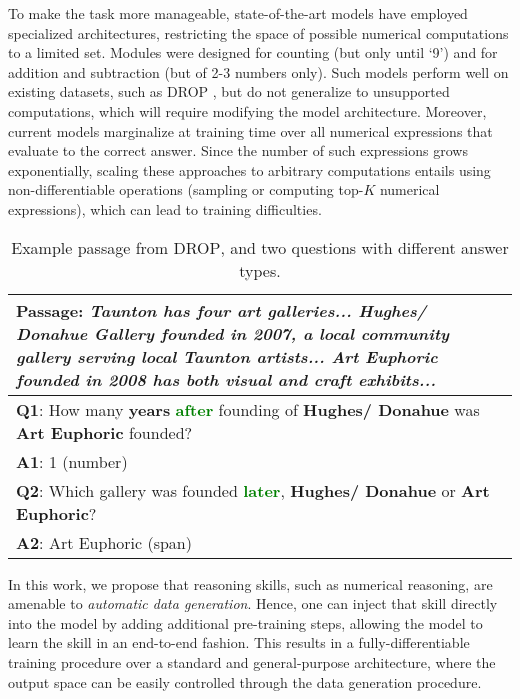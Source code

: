 \documentclass[11pt,a4paper]{article}
\newcommand\drop{\textsc{DROP}}
\begin{document}
To make the task more manageable, state-of-the-art models have employed specialized architectures, restricting the space of possible numerical computations to a limited set. Modules were designed for counting (but only until `9') and for addition and subtraction (but of 2-3 numbers only). Such models perform well on existing datasets, such as \drop{} \cite{dua2019drop}, but do not generalize to unsupported computations, which will require modifying the model architecture.
Moreover, current models marginalize at training time over all numerical expressions that evaluate to the correct answer. Since the number of such expressions grows exponentially, scaling these approaches to arbitrary computations entails using non-differentiable operations (sampling or computing top-$K$ numerical expressions), which can lead to training difficulties.

\begin{table}
\setlength{\abovecaptionskip}{-2pt}
\setlength{\belowcaptionskip}{-15pt}
\begin{center}
\footnotesize
\begin{tabular}{p{7.0cm}}
\toprule
\textbf{Passage}: \textit{Taunton has four art galleries... \textbf{\textcolor{myblue}{Hughes/ Donahue Gallery}} founded in \textbf{\textcolor{myred}{2007}}, a local community gallery serving local Taunton artists... \textbf{\textcolor{myblue}{Art Euphoric}} founded in \textbf{\textcolor{myred}{2008}} has both visual and craft exhibits...} \\ \hline
\textbf{Q1}: How many \textbf{\textcolor{myred}{years}} \textbf{\textcolor{Green}{after}} founding of \textbf{\textcolor{myblue}{Hughes/ Donahue}} was \textbf{\textcolor{myblue}{Art Euphoric}} founded? \\
\textbf{A1}: 1 (number) \\ \hline
\textbf{Q2}: Which gallery was founded \textbf{\textcolor{Green}{later}},  \textbf{\textcolor{myblue}{Hughes/ Donahue}} or \textbf{\textcolor{myblue}{Art Euphoric}}? \\
\textbf{A2}: Art Euphoric (span) \\
\toprule
\end{tabular}
\end{center}
\caption{Example passage from \drop{}, and two questions with different answer types.}
\label{table:drop_example}
\end{table}




In this work, we propose that reasoning skills, such as numerical reasoning, are amenable to \emph{automatic data generation}. Hence, one can inject that skill directly into the model by adding additional pre-training steps, allowing the model to learn the skill in an end-to-end fashion. This results in a fully-differentiable training procedure over a standard and general-purpose architecture, where the output space can be easily controlled through the data generation procedure. 
\end{document}
